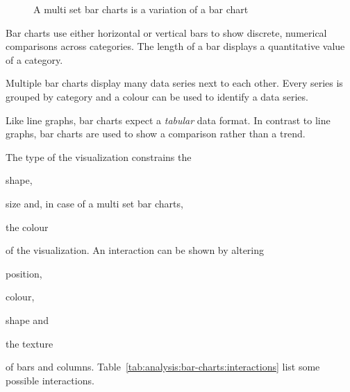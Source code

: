 \begin{figure}
  \begin{center}
    \qquad
  \end{center}
  \caption{A multi set bar charts is a variation of a bar chart}
  \label{fig:analysis:bar-charts}
\end{figure}

Bar charts use either horizontal or vertical bars to show discrete, numerical comparisons across categories.
The length of a bar displays a quantitative value of a category.

Multiple bar charts display many data series next to each other.
Every series is grouped by category and a colour can be used to identify a data series.

Like line graphs, bar charts expect a \emph{tabular} data format.
In contrast to line graphs, bar charts are used to show a comparison rather than a trend.

The type of the visualization constrains the
\begin{enumerate*}[label=(\arabic*)]
    \item shape,
    \item size and, in case of a multi set bar charts,
    \item the colour
\end{enumerate*}
of the visualization.
An interaction can be shown by altering
\begin{enumerate*}[label=(\arabic*)]
    \item position,
    \item colour,
    \item shape and
    \item the texture
\end{enumerate*}
of bars and columns.
Table~\ref{tab:analysis:bar-charts:interactions} list some possible interactions.


